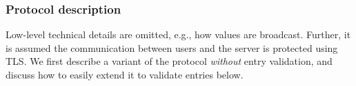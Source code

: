 \documentclass{article}
\begin{document}

\subsubsection{Protocol description} 

Low-level technical details are omitted, e.g., how values are broadcast. Further, it is assumed the communication between users and the server is protected using TLS. We first describe a variant of the protocol {\em without} entry validation, and discuss how to easily extend it to validate entries below.


\newcommand{\id}{\mathrm{id}}
\newcommand{\dt}{\mathrm{dt}}
\end{document}
